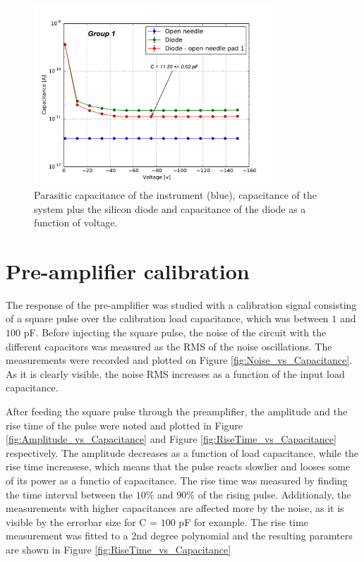 \documentclass[12pt]{article}
\begin{document}
\begin{figure}[t!]
  \centering
  \includegraphics[width=0.8\textwidth]{./graphics/V_vs_C}
  \caption{Parasitic capacitance of the instrument (blue), capacitance of the system plus the silicon diode and capacitance of the diode as a function of voltage.}
  \label{fig:VC_curve_single}
\end{figure}

\section{Pre-amplifier calibration}

The response of the pre-amplifier was studied with a calibration signal consisting of a square pulse over the calibration load capacitance, which was between $1$ and $100$ pF. 
Before injecting the square pulse, the noise of the circuit with the different capacitors was measured as the RMS of the noise oscillations. The measurements were recorded and plotted on Figure \ref{fig:Noise_vs_Capacitance}. As it is clearly visible, the noise RMS increases as a function of the input load capacitance.
%
%

After feeding the square pulse through the preamplifier, the amplitude and the rise time of the pulse were noted and plotted in Figure \ref{fig:Amplitude_vs_Capacitance} and Figure \ref{fig:RiseTime_vs_Capacitance} respectively. The amplitude decreases as a function of load capacitance, while the rise time increasese, which means that the pulse reacts slowlier and looses some of its power as a functio of capacitance. The rise time was measured by finding the time interval between the $10\%$ and $90\%$ of the rising pulse. 
Additionaly, the measurements with higher capacitances are affected more by the noise, as it is visible by the errorbar size for C = $100$ pF for example. The rise time measurement was fitted to a $2$nd degree polynomial and the resulting paramters are shown in Figure \ref{fig:RiseTime_vs_Capacitance} 
\end{document}

